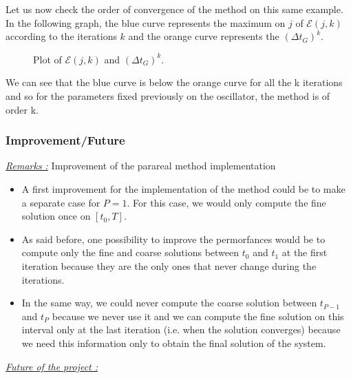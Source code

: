 \noindent Let us now check the order of convergence of the method on this same example. In the following graph, the blue curve represents the maximum on $j$ of $\mathcal{E}(j,k)$ according to the iterations $k$ and the orange curve represents the $(\Delta t_G)^k$.
\begin{figure}[H]
	\centering
	\caption{Plot of $\mathcal{E}(j,k)$ and $(\Delta t_G)^k$.}
\end{figure}
\noindent We can see that the blue curve is below the orange curve for all the k iterations and so for the parameters fixed previously on the oscillator, the method is of order k.

\subsubsection{Improvement/Future}
\label{improve}

\noindent \underline{\textit{Remarks :}} Improvement of the parareal method implementation 

\begin{itemize}[label=-]
	\item A first improvement for the implementation of the method could be to make a separate case for $P=1$. For this case, we would only compute the fine solution once on $[t_0,T]$.
	\item As said before, one possibility to improve the permorfances would be to compute only the fine and coarse solutions between $t_0$ and $t_1$ at the first iteration because they are the only ones that never change during the iterations. 
	\item In the same way, we could never compute the coarse solution between $t_{P-1}$ and $t_P$ because we never use it and we can compute the fine solution on this interval only at the last iteration (i.e. when the solution converges) because we need this information only to obtain the final solution of the system.
\end{itemize}

\noindent \underline{\textit{Future of the project :}}

